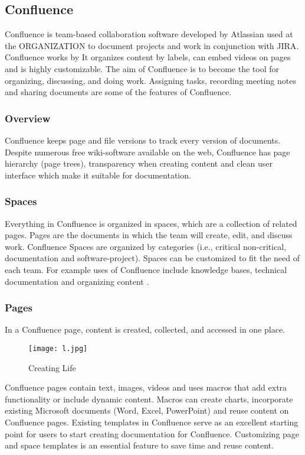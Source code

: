 \subsection {Confluence}
\gls{Confluence} is team-based collaboration software developed by Atlassian used at the ORGANIZATION to document projects and work in conjunction with \gls{JIRA}. Confluence works by It organizes content by labels, can embed videos on pages and is highly customizable. The aim of Confluence is to become the tool for organizing, discussing, and doing work. Assigning tasks, recording meeting notes and sharing documents are some of the features of Confluence.
\subsubsection{Overview}
Confluence keeps page and file versions to track every version of documents. Despite numerous free wiki-software available on the web, Confluence has page hierarchy (page trees), transparency when creating content and clean user interface which make it suitable for documentation.
\subsubsection{Spaces}
Everything in Confluence is organized in spaces, which are a collection of related pages. Pages are the documents in which the team will create, edit, and discuss work. Confluence Spaces are organized by categories (i.e., critical non-critical, documentation and software-project). Spaces can be customized to fit the need of each team. For example uses of Confluence include knowledge bases, technical documentation and organizing content \cite{confluence:Online}.
\subsubsection{Pages}
In a Confluence page, content is created, collected, and accessed in one place.

\begin{figure}[H]
	\centering
	\texttt{[image: l.jpg]}
	\caption{Creating Life}
\end{figure}

\noindent \gls{Confluence} pages contain text, images, videos and uses macros that add extra functionality or include dynamic content. Macros can create charts, incorporate existing Microsoft documents (Word, Excel, PowerPoint) and reuse content on Confluence pages. Existing templates in Confluence serve as an excellent starting point for users to start creating documentation for Confluence. Customizing page and space templates is an essential feature to save time and reuse content.

